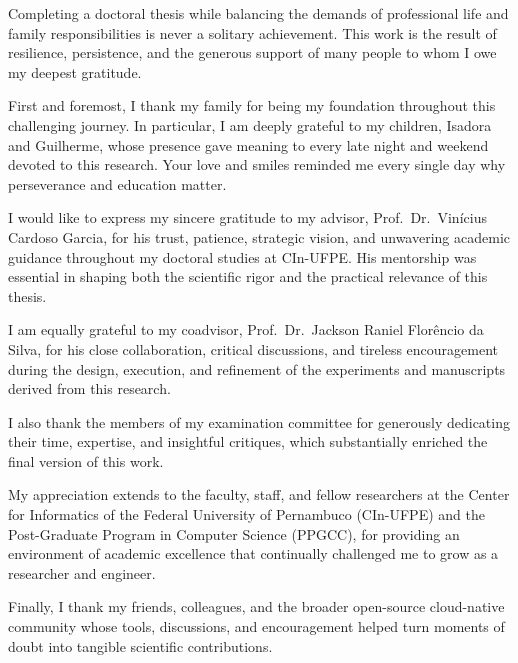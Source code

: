 \begin{agradecimentos}
Completing a doctoral thesis while balancing the demands of professional life and family responsibilities is never a solitary achievement. This work is the result of resilience, persistence, and the generous support of many people to whom I owe my deepest gratitude.

First and foremost, I thank my family for being my foundation throughout this challenging journey. In particular, I am deeply grateful to my children, Isadora and Guilherme, whose presence gave meaning to every late night and weekend devoted to this research. Your love and smiles reminded me every single day why perseverance and education matter.

I would like to express my sincere gratitude to my advisor, Prof.\ Dr.\ Vin\'{i}cius Cardoso Garcia, for his trust, patience, strategic vision, and unwavering academic guidance throughout my doctoral studies at CIn-UFPE. His mentorship was essential in shaping both the scientific rigor and the practical relevance of this thesis.

I am equally grateful to my coadvisor, Prof.\ Dr.\ Jackson Raniel Flor\^{e}ncio da Silva, for his close collaboration, critical discussions, and tireless encouragement during the design, execution, and refinement of the experiments and manuscripts derived from this research.

I also thank the members of my examination committee for generously dedicating their time, expertise, and insightful critiques, which substantially enriched the final version of this work.

My appreciation extends to the faculty, staff, and fellow researchers at the Center for Informatics of the Federal University of Pernambuco (CIn-UFPE) and the Post-Graduate Program in Computer Science (PPGCC), for providing an environment of academic excellence that continually challenged me to grow as a researcher and engineer.

Finally, I thank my friends, colleagues, and the broader open-source cloud-native community whose tools, discussions, and encouragement helped turn moments of doubt into tangible scientific contributions.
\end{agradecimentos}
